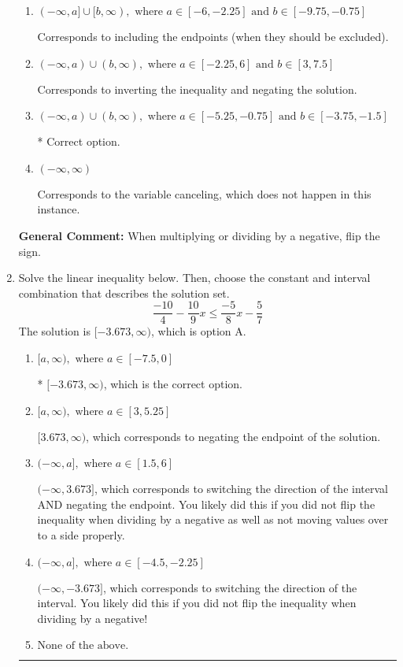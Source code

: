 \documentclass{extbook}[14pt]
\newcommand{\litem}[1]{\item #1

\rule{\textwidth}{0.4pt}}
\begin{document}
\begin{enumerate}
{\begin{enumerate}[label=\Alph*.]
Corresponds to including the endpoints AND negating.
\item \( (-\infty, a] \cup [b, \infty), \text{ where } a \in [-6, -2.25] \text{ and } b \in [-9.75, -0.75] \)

Corresponds to including the endpoints (when they should be excluded).
\item \( (-\infty, a) \cup (b, \infty), \text{ where } a \in [-2.25, 6] \text{ and } b \in [3, 7.5] \)

Corresponds to inverting the inequality and negating the solution.
\item \( (-\infty, a) \cup (b, \infty), \text{ where } a \in [-5.25, -0.75] \text{ and } b \in [-3.75, -1.5] \)

 * Correct option.
\item \( (-\infty, \infty) \)

Corresponds to the variable canceling, which does not happen in this instance.
\end{enumerate}

\textbf{General Comment:} When multiplying or dividing by a negative, flip the sign.
}
\litem{
Solve the linear inequality below. Then, choose the constant and interval combination that describes the solution set.
\[ \frac{-10}{4} - \frac{10}{9} x \leq \frac{-5}{8} x - \frac{5}{7} \]The solution is \( [-3.673, \infty) \), which is option A.\begin{enumerate}[label=\Alph*.]
\item \( [a, \infty), \text{ where } a \in [-7.5, 0] \)

* $[-3.673, \infty)$, which is the correct option.
\item \( [a, \infty), \text{ where } a \in [3, 5.25] \)

 $[3.673, \infty)$, which corresponds to negating the endpoint of the solution.
\item \( (-\infty, a], \text{ where } a \in [1.5, 6] \)

 $(-\infty, 3.673]$, which corresponds to switching the direction of the interval AND negating the endpoint. You likely did this if you did not flip the inequality when dividing by a negative as well as not moving values over to a side properly.
\item \( (-\infty, a], \text{ where } a \in [-4.5, -2.25] \)

 $(-\infty, -3.673]$, which corresponds to switching the direction of the interval. You likely did this if you did not flip the inequality when dividing by a negative!
\item \( \text{None of the above}. \)


\end{enumerate}}
\end{enumerate}
\end{document}
